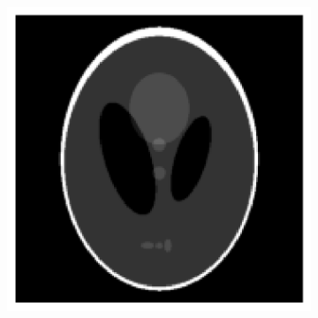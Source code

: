\documentclass[12pt]{article}
\begin{document}
\begin{figure}
\begin{subfigure}{.25\textwidth}
\end{subfigure}%
\begin{subfigure}{.25\textwidth}
    \centering
    \includegraphics[width=\textwidth]{../figures/GT.png}
\end{subfigure}%
\label{fig: experiments}
\end{figure}%
\end{document}
